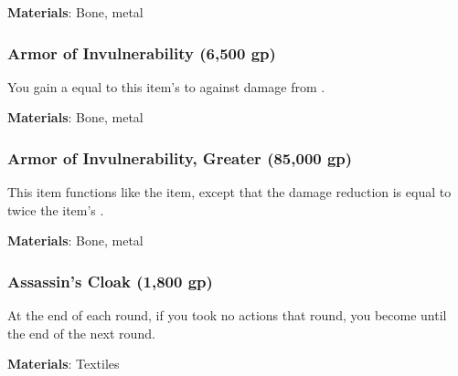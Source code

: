 \vspace{0.25em}
\textbf{Materials}: Bone, metal


\lowercase{\hypertarget{item:Armor of Invulnerability}{}}\label{item:Armor of Invulnerability}
\hypertarget{item:Armor of Invulnerability}{\subsubsection{Armor of Invulnerability\hfill{} (6,500 gp)}}

You gain a  equal to this item's  to  against damage from .



\vspace{0.25em}
\textbf{Materials}: Bone, metal


\lowercase{\hypertarget{item:Armor of Invulnerability, Greater}{}}\label{item:Armor of Invulnerability, Greater}
\hypertarget{item:Armor of Invulnerability, Greater}{\subsubsection{Armor of Invulnerability, Greater\hfill{} (85,000 gp)}}

This item functions like the  item, except that the damage reduction is equal to twice the item's .



\vspace{0.25em}
\textbf{Materials}: Bone, metal


\lowercase{\hypertarget{item:Assassin's Cloak}{}}\label{item:Assassin's Cloak}
\hypertarget{item:Assassin's Cloak}{\subsubsection{Assassin's Cloak\hfill{} (1,800 gp)}}

At the end of each round, if you took no actions that round, you become  until the end of the next round.



\vspace{0.25em}
\textbf{Materials}: Textiles


